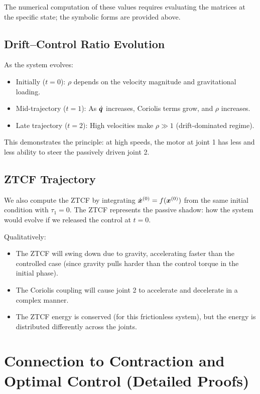 The numerical computation of these values requires evaluating the matrices at the specific state;
the symbolic forms are provided above.

\subsection{Drift--Control Ratio Evolution}

As the system evolves:
\begin{itemize}
\item Initially ($t=0$): $\rho$ depends on the velocity magnitude and gravitational loading.
\item Mid-trajectory ($t=1$): As $\dot{\bm{q}}$ increases, Coriolis terms grow, and $\rho$ increases.
\item Late trajectory ($t=2$): High velocities make $\rho \gg 1$ (drift-dominated regime).
\end{itemize}

This demonstrates the principle: at high speeds, the motor at joint 1 has less and less
ability to steer the passively driven joint 2.

\subsection{ZTCF Trajectory}

We also compute the ZTCF by integrating $\dot{\bm{x}}^{(0)} = f(\bm{x}^{(0)})$ from the same initial
condition with $\tau_1=0$. The ZTCF represents the passive shadow: how the system would evolve
if we released the control at $t=0$.

Qualitatively:
\begin{itemize}
\item The ZTCF will swing down due to gravity, accelerating faster than the controlled case
      (since gravity pulls harder than the control torque in the initial phase).
\item The Coriolis coupling will cause joint 2 to accelerate and decelerate in a complex manner.
\item The ZTCF energy is conserved (for this frictionless system), but the energy is distributed
      differently across the joints.
\end{itemize}

\section{Connection to Contraction and Optimal Control (Detailed Proofs)}

